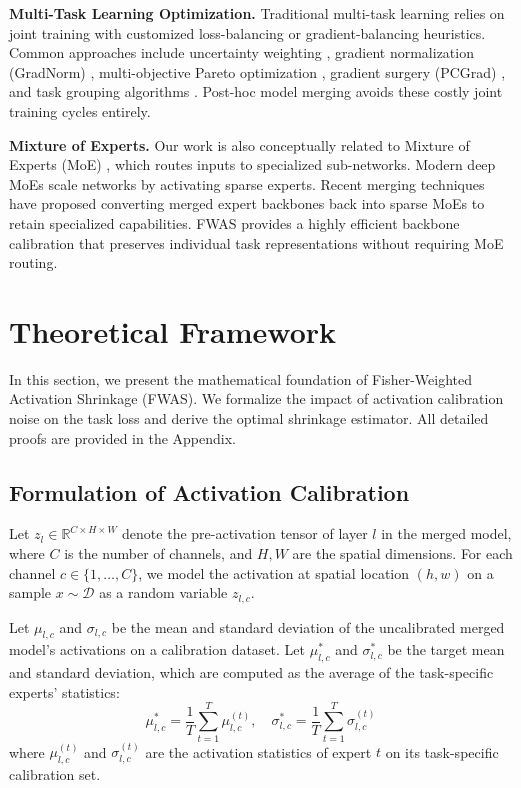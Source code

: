 \documentclass{article}
\theoremstyle{plain}
\theoremstyle{definition}
\theoremstyle{remark}
\begin{document}
\textbf{Multi-Task Learning Optimization.} Traditional multi-task learning relies on joint training with customized loss-balancing or gradient-balancing heuristics. Common approaches include uncertainty weighting \cite{kendall2018multi}, gradient normalization (GradNorm) \cite{chen2018gradnorm}, multi-objective Pareto optimization \cite{sener2018multi}, gradient surgery (PCGrad) \cite{yu2020gradient}, and task grouping algorithms \cite{fifty2021efficiently, wang2020generalization}. Post-hoc model merging avoids these costly joint training cycles entirely.

\textbf{Mixture of Experts.} Our work is also conceptually related to Mixture of Experts (MoE) \cite{jacobs1991adaptive, gonen2011multiple}, which routes inputs to specialized sub-networks. Modern deep MoEs \cite{shazeer2017outrageously, fedus2021switch, lepikhin2020gshard, zhou2022mixture} scale networks by activating sparse experts. Recent merging techniques have proposed converting merged expert backbones back into sparse MoEs \cite{shen2023mixture, gu2023patching} to retain specialized capabilities. FWAS provides a highly efficient backbone calibration that preserves individual task representations without requiring MoE routing.

\section{Theoretical Framework}
\label{sec:theory}
In this section, we present the mathematical foundation of Fisher-Weighted Activation Shrinkage (FWAS). We formalize the impact of activation calibration noise on the task loss and derive the optimal shrinkage estimator. All detailed proofs are provided in the Appendix.

\subsection{Formulation of Activation Calibration}

Let $z_{l} \in \mathbb{R}^{C \times H \times W}$ denote the pre-activation tensor of layer $l$ in the merged model, where $C$ is the number of channels, and $H, W$ are the spatial dimensions. For each channel $c \in \{1, \dots, C\}$, we model the activation at spatial location $(h, w)$ on a sample $x \sim \mathcal{D}$ as a random variable $z_{l,c}$.

Let $\mu_{l,c}$ and $\sigma_{l,c}$ be the mean and standard deviation of the uncalibrated merged model's activations on a calibration dataset. Let $\mu^*_{l,c}$ and $\sigma^*_{l,c}$ be the target mean and standard deviation, which are computed as the average of the task-specific experts' statistics:
\begin{equation}
    \mu^*_{l,c} = \frac{1}{T}\sum_{t=1}^T \mu^{(t)}_{l,c}, \quad \sigma^*_{l,c} = \frac{1}{T}\sum_{t=1}^T \sigma^{(t)}_{l,c}
\end{equation}
where $\mu^{(t)}_{l,c}$ and $\sigma^{(t)}_{l,c}$ are the activation statistics of expert $t$ on its task-specific calibration set.
\end{document}
